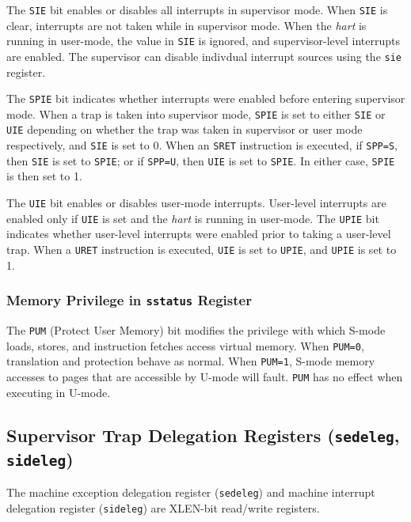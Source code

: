 The \texttt{SIE} bit enables or disables all interrupts in supervisor mode. When
\texttt{SIE} is clear, interrupts are not taken while in supervisor mode. When
the \emph{hart} is running in user-mode, the value in \texttt{SIE} is ignored,
and supervisor-level interrupts are enabled. The supervisor can disable
indivdual interrupt sources using the \texttt{sie} register.

The \texttt{SPIE} bit indicates whether interrupts were enabled before entering
supervisor mode. When a trap is taken into supervisor mode, \texttt{SPIE} is set
to either \texttt{SIE} or \texttt{UIE} depending on whether the trap was taken in
supervisor or user mode respectively, and \texttt{SIE} is set to 0. When an \texttt{SRET}
instruction is executed, if \texttt{SPP=S}, then \texttt{SIE} is set to \texttt{SPIE}; or if \texttt{SPP=U},
then \texttt{UIE} is set to \texttt{SPIE}. In either case, \texttt{SPIE} is then set to 1.

The \texttt{UIE} bit enables or disables user-mode interrupts. User-level
interrupts are enabled only if \texttt{UIE} is set and the \emph{hart} is
running in user-mode. The \texttt{UPIE} bit indicates whether user-level
interrupts were enabled prior to taking a user-level trap. When a \texttt{URET}
instruction is executed, \texttt{UIE} is set to \texttt{UPIE}, and \texttt{UPIE}
is set to 1.

\subsubsection{Memory Privilege in \texttt{sstatus} Register
}\label{memory-privilege-in-sstatus-register}

The \texttt{PUM} (Protect User Memory) bit modifies the privilege with which
S-mode loads, stores, and instruction fetches access virtual memory. When
\texttt{PUM=0}, translation and protection behave as normal. When
\texttt{PUM=1}, S-mode memory accesses to pages that are accessible by U-mode
will fault. \texttt{PUM} has no effect when executing in U-mode.

\subsection{Supervisor Trap Delegation Registers (\texttt{sedeleg},
\texttt{sideleg})}\label{supervisor-trap-delegation-registers-sedeleg-sideleg}

The machine exception delegation register (\texttt{sedeleg}) and machine
interrupt delegation register (\texttt{sideleg}) are XLEN-bit read/write
registers.

